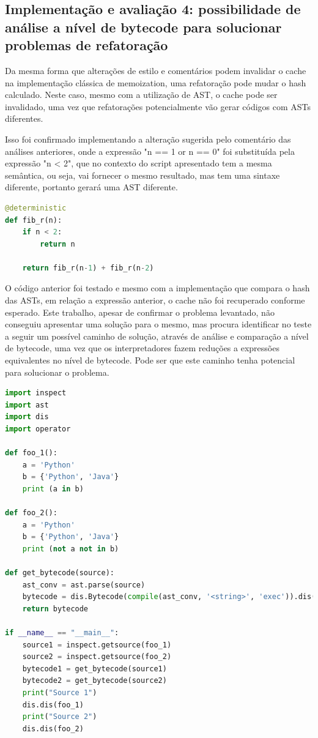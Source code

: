 \documentclass[sigconf]{acmart}
\begin{document}
\subsection{Implementação e avaliação 4: possibilidade de análise a nível de bytecode para solucionar problemas de refatoração}
Da mesma forma que alterações de estilo e comentários podem invalidar o cache na implementação clássica de memoization, uma refatoração pode mudar o hash calculado. Neste caso, mesmo com a utilização de AST, o cache pode ser invalidado, uma vez que refatorações potencialmente vão gerar códigos com ASTs diferentes.

Isso foi confirmado implementando a alteração sugerida pelo comentário das análises anteriores, onde a expressão "n == 1 or n == 0" foi substituída pela expressão "n < 2", que no contexto do script apresentado tem a mesma semântica, ou seja, vai fornecer o mesmo resultado, mas tem uma sintaxe diferente, portanto gerará uma AST diferente.

\renewcommand{\lstlistingname}{Trecho de código}
\begin{lstlisting}[language=Python, caption=Alteração da expressão no código]
@deterministic
def fib_r(n):
    if n < 2:
        return n

    return fib_r(n-1) + fib_r(n-2)
\end{lstlisting}

O código anterior foi testado e mesmo com a implementação que compara o hash das ASTs, em relação a expressão anterior, o cache não foi recuperado conforme esperado. Este trabalho, apesar de confirmar o problema levantado, não conseguiu apresentar uma solução para o mesmo, mas procura identificar no teste a seguir um possível caminho de solução, através de análise e comparação a nível de bytecode, uma vez que os interpretadores fazem reduções a expressões equivalentes no nível de bytecode. Pode ser que este caminho tenha potencial para solucionar o problema.

\renewcommand{\lstlistingname}{Trecho de código}
\begin{lstlisting}[language=Python, caption=Comparação a nível de bytecode]
import inspect
import ast
import dis
import operator

def foo_1():
	a = 'Python'
	b = {'Python', 'Java'}
	print (a in b)

def foo_2():
	a = 'Python'
	b = {'Python', 'Java'}
	print (not a not in b)

def get_bytecode(source):
	ast_conv = ast.parse(source)
	bytecode = dis.Bytecode(compile(ast_conv, '<string>', 'exec')).dis()
	return bytecode

if __name__ == "__main__":
	source1 = inspect.getsource(foo_1)
	source2 = inspect.getsource(foo_2)
	bytecode1 = get_bytecode(source1)
	bytecode2 = get_bytecode(source2)
	print("Source 1")
	dis.dis(foo_1)
	print("Source 2")
	dis.dis(foo_2)
\end{lstlisting}
\end{document}
